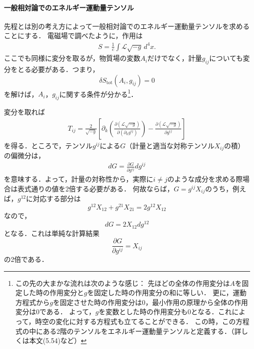 \documentclass[a4paper]{ltjsreport}
\begin{document}
\paragraph{一般相対論でのエネルギー運動量テンソル}
先程とは別の考え方によって一般相対論でのエネルギー運動量テンソルを求めることにする．
電磁場で調べたように，作用は
\begin{align}
  S = \frac{1}{c}\int{}\mathcal{L}\sqrt{ - g}\,d^4x .
\end{align}
ここでも同様に変分を取るが，物質場の変数$A_i$だけでなく，計量$g_{ij}$についても変分をとる必要がある．つまり，
\[\delta{S}_{\text{tot}}(A_i,g_{ij})=0\]
を解けば，$A_i$，$g_{ij}$に関する条件が分かる\footnote{この先の大まかな流れは次のような感じ：
先ほどの全体の作用変分は$A$を固定した時の作用変分と$g$を固定した時の作用変分の和に等しい．
更に，運動方程式から$g$を固定させた時の作用変分は0，最小作用の原理から全体の作用変分は0である．
よって，$g$を変数とした時の作用変分も0となる．これによって，時空の変化に対する方程式も立てることができる．
この時，この方程式の中にある2階のテンソルをエネルギー運動量テンソルと定義する．（詳しくは本文(5.54)など）}．

変分を取れば
\begin{align}
  T_{ij}=\frac{2}{\sqrt{ - g}}\left[\partial_k\left(\frac{\partial{}(\mathcal{L}\sqrt{ - g})}{\partial(\partial_k{g^{ij}})}\right) - \frac{\partial(\mathcal{L}\sqrt{ - g})}{\partial{g^{ij}}}\right]
  \label{em_ep_tensor}
\end{align}
を得る．ところで，テンソル$g^{ij}$による$G$（計量と適当な対称テンソル$X_{ij}$の積）の偏微分は，
\begin{align}
  dG=\frac{\partial{G}}{\partial{g^{ij}}}dg^{ij}
\end{align}
を意味する．よって，計量の対称性から，実際に$i\neq{j}$のような成分を求める際場合は表式通りの値を2倍する必要がある．
何故ならば，$G=g^{ij}X_{ij}$のうち，例えば，$g^{12}$に対応する部分は
\[g^{12}X_{12} + g^{21}X_{21}=2g^{12}X_{12}\]
なので，
\[dG=2X_{12}dg^{12}\]
となる．これは単純な計算結果
\[\frac{\partial{}G}{\partial{g^{ij}}}=X_{ij}\]
の2倍である．
\end{document}
